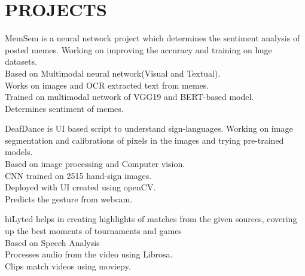\documentclass[]{deedy-resume-openfont}
\begin{document}
\begin{minipage}[t]{0.66\textwidth} 



\section{PROJECTS}

MemSem is a neural network project which determines the sentiment analysis
of posted memes. Working on improving the accuracy and training on huge
datasets. \\

\textbullet{} Based on Multimodal neural network(Visual and Textual). \\
\textbullet{} Works on images and OCR extracted text from memes. \\
\textbullet{} Trained on multimodal network of VGG19 and BERT-based model. \\
\textbullet{} Determines sentiment of memes. \\
\sectionsep

DeafDance is UI based script to understand sign-languages. Working on image
segmentation and calibrations of pixels in the images and trying pre-trained
models. \\

\textbullet{} Based on image processing and Computer vision. \\
\textbullet{} CNN trained on 2515 hand-sign images. \\
\textbullet{} Deployed with UI created using openCV. \\
\textbullet{} Predicts the gesture from webcam.\\
\sectionsep

hiLyted helps in creating highlights of matches from the given sources, covering
up the best moments of tournaments and games \\

\textbullet{} Based on Speech Analysis \\
\textbullet{} Processes audio from the video using Librosa. \\
\textbullet{} Clips match videos using moviepy. \\
\sectionsep


\end{minipage}
\end{document}
